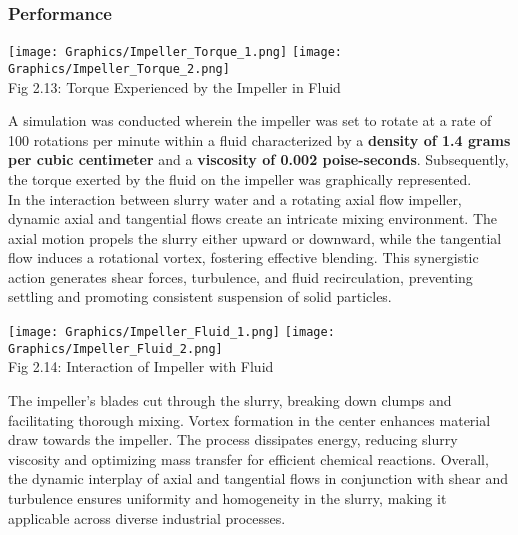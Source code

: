 \documentclass[a4,10pt]{report}
\begin{document}
\subsubsection{Performance}
\begin{center}
    \texttt{[image: Graphics/Impeller\_Torque\_1.png]}
    \texttt{[image: Graphics/Impeller\_Torque\_2.png]} \\
    \normalsize{Fig 2.13: Torque Experienced by the Impeller in Fluid} \\
\end{center}
A simulation was conducted wherein the impeller was set to rotate at a rate of 100 rotations per minute within a fluid characterized by a \textbf{density of 1.4 grams per cubic centimeter} and a \textbf{viscosity of 0.002 poise-seconds}. Subsequently, the torque exerted by the fluid on the impeller was graphically represented.\cite{torque_impeller} 
\vspace{2mm} \\
In the interaction between slurry water and a rotating axial flow impeller, dynamic axial and tangential flows create an intricate mixing environment. The axial motion propels the slurry either upward or downward, while the tangential flow induces a rotational vortex, fostering effective blending. This synergistic action generates shear forces, turbulence, and fluid recirculation, preventing settling and promoting consistent suspension of solid particles. 
\begin{center}
    \texttt{[image: Graphics/Impeller\_Fluid\_1.png]}
    \texttt{[image: Graphics/Impeller\_Fluid\_2.png]} \\
    \normalsize{Fig 2.14: Interaction of Impeller with Fluid} \\
\end{center}
The impeller's blades cut through the slurry, breaking down clumps and facilitating thorough mixing. Vortex formation in the center enhances material draw towards the impeller. The process dissipates energy, reducing slurry viscosity and optimizing mass transfer for efficient chemical reactions. Overall, the dynamic interplay of axial and tangential flows in conjunction with shear and turbulence ensures uniformity and homogeneity in the slurry, making it applicable across diverse industrial processes.
\end{document}
